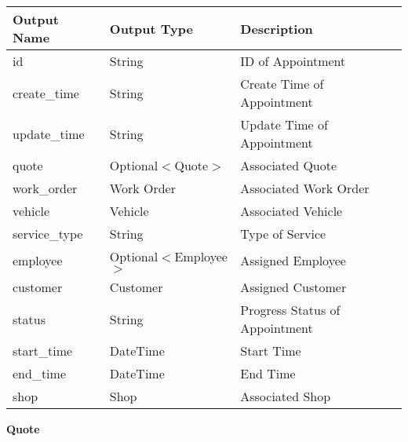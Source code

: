 \documentclass[12pt, titlepage]{article}
\begin{document}
\begin{table}[H]
	\begin{tabular}{|l|l|l|}
		\hline
		\textbf{Output Name} & \textbf{Output Type}   & \textbf{Description}           \\
		\hline
		id                   & String                 & ID of Appointment              \\
		\hline
		create\_time         & String                 & Create Time of Appointment     \\
		\hline
		update\_time         & String                 & Update Time of Appointment     \\
		\hline
		quote                & Optional$<$Quote$>$    & Associated Quote               \\
		\hline
		work\_order          & Work Order             & Associated Work Order          \\
		\hline
		vehicle              & Vehicle                & Associated Vehicle             \\
		\hline
		service\_type        & String                 & Type of Service                \\
		\hline
		employee             & Optional$<$Employee$>$ & Assigned Employee              \\
		\hline
		customer             & Customer               & Assigned Customer              \\
		\hline
		status               & String                 & Progress Status of Appointment \\
		\hline
		start\_time          & DateTime               & Start Time                     \\
		\hline
		end\_time            & DateTime               & End Time                       \\
		\hline
		shop                 & Shop                   & Associated Shop                \\
		\hline
	\end{tabular}
\end{table}

\textbf{Quote}
\end{document}
